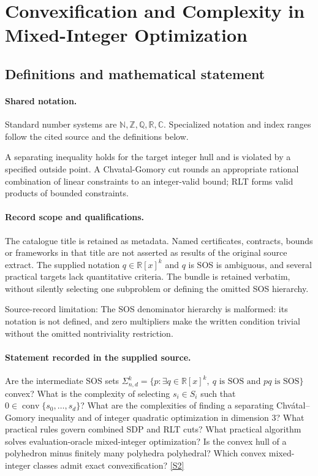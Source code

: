 \documentclass[11pt]{article}
\newcommand{\sref}[2]{\hyperlink{source:#1:#2}{[S#2]}}
\begin{document}
\section{Convexification and Complexity in Mixed-Integer Optimization}\label{statement}

\subsection{Definitions and mathematical statement}

\paragraph{Shared notation.}Standard number systems are $\mathbb N,\mathbb Z,\mathbb Q,\mathbb R,\mathbb C$. Specialized notation and index ranges follow the cited source and the definitions below.


A separating inequality holds for the target integer hull and is violated by a specified outside point. A Chvatal-Gomory cut rounds an appropriate rational combination of linear constraints to an integer-valid bound; RLT forms valid products of bounded constraints.
\paragraph{Record scope and qualifications.}
The catalogue title is retained as metadata. Named certificates, contracts, bounds or frameworks in that title are not asserted as results of the original source extract.
The supplied notation $q\in\mathbb R[x]^k$ and $q$ is SOS is ambiguous, and several practical targets lack quantitative criteria. The bundle is retained verbatim, without silently selecting one subproblem or defining the omitted SOS hierarchy.

Source-record limitation: The SOS denominator hierarchy is malformed: its notation is not defined, and zero multipliers make the written condition trivial without the omitted nontriviality restriction.
\paragraph{Statement recorded in the supplied source.}
Are the intermediate SOS sets $\Sigma^k_{n,d}=\{p:\exists q\in\mathbb{R}[x]^k,\ q\text{ is SOS and }pq\text{ is SOS}\}$ convex? What is the complexity of selecting $s_i\in S_i$ such that $0\in\operatorname{conv}\{s_0,\ldots,s_d\}$? What are the complexities of finding a separating Chvátal–Gomory inequality and of integer quadratic optimization in dimension $3$? What practical rules govern combined SDP and RLT cuts? What practical algorithm solves evaluation-oracle mixed-integer optimization? Is the convex hull of a polyhedron minus finitely many polyhedra polyhedral? Which convex mixed-integer classes admit exact convexification? \sref{statement}{2}
\end{document}

